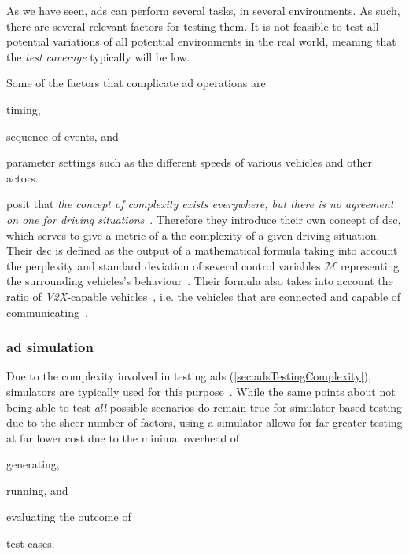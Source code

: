 As we have seen, \acrshort{ads} can perform several tasks, in several environments. As such, there
are several relevant factors for testing them. It is not feasible to test all potential variations
of all potential environments in the real world, meaning that the \textit{test coverage} typically
will be low.

Some of the factors that complicate \acrshort{ad} operations are \begin{inparaenum}
    \item timing,
    \item sequence of events, and
    \item parameter settings such as the different speeds of various vehicles and other actors.
\end{inparaenum}

\citeauthor{adsComplexityIndex18} posit that \textit{the concept of complexity exists everywhere,
    but there is no agreement on one for driving situations}~\cite[1182]{adsComplexityIndex18}.
Therefore they introduce their own concept of \acrfull{dsc}, which serves to give a metric of a
the complexity of a given driving situation. Their \acrshort{dsc} is defined as the output of a
mathematical formula taking into account the perplexity and standard deviation of several
control variables $\mathcal{M}$ representing the surrounding vehicles's
behaviour~\cite[1182]{adsComplexityIndex18}. Their formula also takes into account the ratio of
\textit{V2X}-capable vehicles~\cite[1182]{adsComplexityIndex18}, i.e. the vehicles that are
connected and capable of communicating~\cite[1]{v2xTestingSurvey2019}.


\subsubsection{\acrlong{ad} simulation}

Due to the complexity involved in testing \acrlong{ads} (\cref{sec:adsTestingComplexity}),
simulators are typically used for this purpose~\cite{DeepScenario}. While the same points about not
being able to test \textit{all} possible scenarios do remain true for simulator based testing due to
the sheer number of factors, using a simulator allows for far greater testing at far lower cost due
to the minimal overhead of
\begin{inparaenum}
    \item generating,
    \item running, and
    \item evaluating the outcome of
\end{inparaenum}
test cases.


